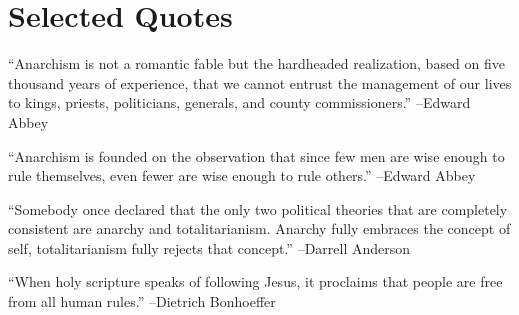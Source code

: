 \documentclass{article}%
\begin{document}
%
\large%
\section{Selected Quotes}%
\label{sec:SelectedQuotes}%
\begin{minipage}{\textwidth}%
\flushleft%
“Anarchism is not a romantic fable but the hardheaded realization, based on five thousand years of experience, that we cannot entrust the management of our lives to kings, priests, politicians, generals, and county commissioners.”%
\linebreak%
\vspace{1mm}%
–Edward Abbey%
\linebreak%
\vspace{1mm}%
\end{minipage}%
\linebreak%
\vspace{1mm}%
\begin{minipage}{\textwidth}%
\flushleft%
“Anarchism is founded on the observation that since few men are wise enough to rule themselves, even fewer are wise enough to rule others.”%
\linebreak%
\vspace{1mm}%
–Edward Abbey%
\linebreak%
\vspace{1mm}%
\end{minipage}%
\linebreak%
\vspace{1mm}%
\begin{minipage}{\textwidth}%
\flushleft%
“Somebody once declared that the only two political theories that are completely consistent are anarchy and totalitarianism. Anarchy fully embraces the concept of self, totalitarianism fully rejects that concept.”%
\linebreak%
\vspace{1mm}%
–Darrell Anderson%
\linebreak%
\vspace{1mm}%
\end{minipage}%
\linebreak%
\vspace{1mm}%
\begin{minipage}{\textwidth}%
\flushleft%
“When holy scripture speaks of following Jesus, it proclaims that people are free from all human rules.”%
\linebreak%
\vspace{1mm}%
–Dietrich Bonhoeffer%
\linebreak%
\vspace{1mm}%
\end{minipage}%
\end{document}
